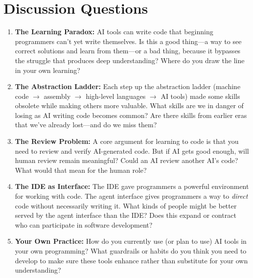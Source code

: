\documentclass[11pt,letterpaper]{article}
\begin{document}
\section*{Discussion Questions}

\begin{questionbox}
\begin{enumerate}[leftmargin=*, label=\textcolor{cswarm}{\textbf{\arabic*.}}]
    \item \textbf{The Learning Paradox:} AI tools can write code that beginning programmers can't yet write themselves. Is this a good thing---a way to see correct solutions and learn from them---or a bad thing, because it bypasses the struggle that produces deep understanding? Where do you draw the line in your own learning?

    \item \textbf{The Abstraction Ladder:} Each step up the abstraction ladder (machine code $\to$ assembly $\to$ high-level languages $\to$ AI tools) made some skills obsolete while making others more valuable. What skills are we in danger of losing as AI writing code becomes common? Are there skills from earlier eras that we've already lost---and do we miss them?

    \item \textbf{The Review Problem:} A core argument for learning to code is that you need to review and verify AI-generated code. But if AI gets good enough, will human review remain meaningful? Could an AI review another AI's code? What would that mean for the human role?

    \item \textbf{The IDE as Interface:} The IDE gave programmers a powerful environment for working with code. The agent interface gives programmers a way to \textit{direct} code without necessarily writing it. What kinds of people might be better served by the agent interface than the IDE? Does this expand or contract who can participate in software development?

    \item \textbf{Your Own Practice:} How do you currently use (or plan to use) AI tools in your own programming? What guardrails or habits do you think you need to develop to make sure these tools enhance rather than substitute for your own understanding?
\end{enumerate}
\end{questionbox}

\end{document}
